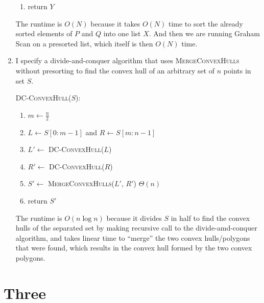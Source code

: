 \documentclass [12pt]{article}
\begin{document}
\begin{enumerate}[label=(\alph*)]
\begin{enumerate}[label=\arabic*.]
                \item return $Y$
            \end{enumerate}
        \cbend


        The runtime is $O(N)$ because it takes $O(N)$ time to sort the already sorted elements of $P$ and $Q$ into one list $X$. And then we are running Graham Scan on a presorted list, which itself is then $O(N)$ time.
        
        \item I specify a divide-and-conquer algorithm that uses \textsc{MergeConvexHulls} without presorting to find the convex hull of an arbitrary set of $n$ points in set $S$.
        
            \cbstart
            \textsc{DC-ConvexHull($S$)}:
            \begin{enumerate}[label=\arabic*.]
                \item $m \leftarrow \frac{n}{2}$
                \item $L \leftarrow S[0:m-1]$ and $R \leftarrow S[m:n-1]$
                \item $L' \leftarrow$ \textsc{DC-ConvexHull($L$)}
                \item $R' \leftarrow$ \textsc{DC-ConvexHull($R$)}
                \item $S' \leftarrow$ \textsc{MergeConvexHulls($L'$, $R'$)} \hspace{1cm} $\Theta(n)$
                \item return $S'$
            \end{enumerate}
        \cbend

        The runtime is $O(n \log n)$ because it divides $S$ in half to find the convex hulls of the separated set by making recursive call to the divide-amd-conquer algorithm, and takes linear time to ``merge'' the two convex hulls/polygons that were found, which results in the convex hull formed by the two convex polygons.

    \end{enumerate}


    \pagebreak


    \section{Three}
    \label{sec:three}
\end{document}
